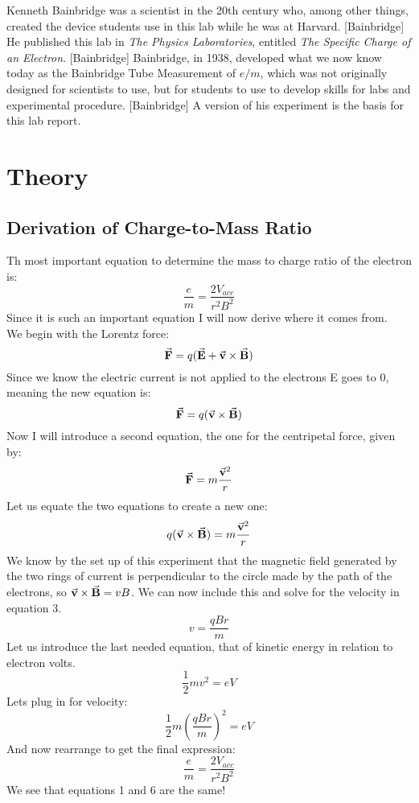 \documentclass[aps,prl,10pt,twocolumn,floatfix]{revtex4-2}
\begin{document}
Kenneth Bainbridge was a scientist in the 20th century who, among other things, created the device students use in this lab while he was at Harvard. [Bainbridge]
He published this lab in \textit{The Physics Laboratories}, entitled \textit{The Specific Charge of an Electron}. [Bainbridge]
Bainbridge, in 1938, developed what we now know today as the Bainbridge Tube Measurement of $e/m$, which was not originally designed for scientists to use, but for students to use to develop skills for labs and experimental procedure. [Bainbridge]
A version of his experiment is the basis for this lab report.


\section{Theory}\label{Theory}
\subsection{Derivation of Charge-to-Mass Ratio}
Th most important equation to determine the mass to charge ratio of the electron is:
\begin{equation}
\frac{e}{m}=\frac{2V_{acc}}{r^2B^2}
\end{equation}
Since it is such an important equation I will now derive where it comes from. \\
We begin with the Lorentz force:
\begin{equation}
\va{F}=q(\va{E}+\va{v}\times \va{B})
\end{equation}
Since we know the electric current is not applied to the electrons E goes to 0, meaning the new equation is:
\begin{equation*}
\va{F}=q(\va{v}\times \va{B})
\end{equation*}
Now I will introduce a second equation, the one for the centripetal force, given by:
\begin{equation*}
\va{F}=m\frac{\va{v}^2}{r}
\end{equation*}
Let us equate the two equations to create a new one:
\begin{equation}
q(\va{v}\times \va{B})=m\frac{\va{v}^2}{r}
\end{equation}
We know by the set up of this experiment that the magnetic field generated by the two rings of current is perpendicular to the circle made by the path of the electrons, so $\va{v}\times \va{B}=vB$.
We can now include this and solve for the velocity in equation 3.
\begin{equation}
v=\frac{qBr}{m}
\end{equation}
Let us introduce the last needed equation, that of kinetic energy in relation to electron volts.
\begin{equation}
\frac{1}{2}mv^2=eV
\end{equation}
Lets plug in for velocity:
\begin{equation*}
\frac{1}{2}m(\frac{qBr}{m})^2=eV
\end{equation*}
And now rearrange to get the final expression:
\begin{equation}
\frac{e}{m}=\frac{2V_{acc}}{r^2B^2}
\end{equation}
We see that equations 1 and 6 are the same!
\end{document}
